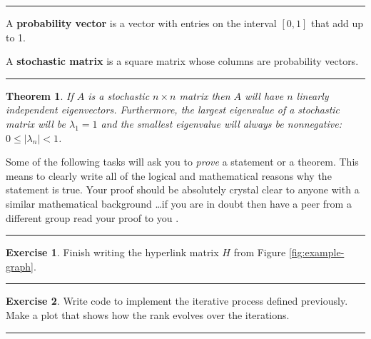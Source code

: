 \documentclass[
]{book}
\newtheorem{theorem}{Theorem}[chapter]
\theoremstyle{definition}
\theoremstyle{definition}
\theoremstyle{definition}
\newtheorem{exercise}{Exercise}[chapter]
\theoremstyle{remark}
\begin{document}
\begin{center}\rule{0.5\linewidth}{0.5pt}\end{center}

A \textbf{probability vector} is a vector with entries on the interval
\([0,1]\) that add up to 1.

A \textbf{stochastic matrix} is a square matrix whose columns are probability
vectors.

\begin{center}\rule{0.5\linewidth}{0.5pt}\end{center}

\begin{theorem}
\protect\hypertarget{thm:largest-ev-stochastic}{}{\label{thm:largest-ev-stochastic} }If \(A\) is a stochastic \(n \times n\)
matrix then \(A\) will have \(n\) linearly independent eigenvectors.
Furthermore, the largest eigenvalue of a stochastic matrix will be
\(\lambda_1 = 1\) and the smallest eigenvalue will always be nonnegative:
\(0 \le |\lambda_n| < 1\).
\end{theorem}

Some of the following tasks will ask you to \emph{prove} a statement or a
theorem. This means to clearly write all of the logical and mathematical
reasons why the statement is true. Your proof should be absolutely
crystal clear to anyone with a similar mathematical background \ldots if you
are in doubt then have a peer from a different group read your proof to
you .

\begin{center}\rule{0.5\linewidth}{0.5pt}\end{center}

\begin{exercise}
\protect\hypertarget{exr:unnamed-chunk-401}{}{\label{exr:unnamed-chunk-401} }Finish writing the hyperlink matrix \(H\) from Figure \ref{fig:example-graph}.
\end{exercise}

\begin{center}\rule{0.5\linewidth}{0.5pt}\end{center}

\begin{exercise}
\protect\hypertarget{exr:unnamed-chunk-402}{}{\label{exr:unnamed-chunk-402} }Write code to implement the iterative process defined previously. Make a
plot that shows how the rank evolves over the iterations.
\end{exercise}

\begin{center}\rule{0.5\linewidth}{0.5pt}\end{center}
\end{document}
